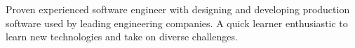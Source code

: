 


\cvparagraph 
Proven experienced software engineer with designing and developing production software used by leading engineering companies. A quick learner enthusiastic to learn new technologies and take on diverse challenges.